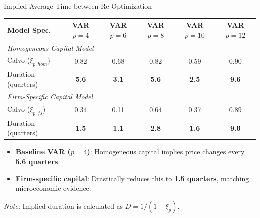 \begin{frame}{Implied Average Time between Re-Optimization}
    \centering
    \scriptsize

    \begin{table}[htpb]
        \centering
        \renewcommand{\arraystretch}{1.1}
        \begin{tabular}{lccccc}
            \toprule
            \textbf{Model Spec.} & \textbf{VAR $p=4$} & \textbf{VAR $p=6$} & \textbf{VAR $p=8$} & \textbf{VAR $p=10$} & \textbf{VAR $p=12$} \\
            \midrule

            \multicolumn{6}{l}{\textit{Homogeneous Capital Model}} \\
            Calvo ($\xi_{p, hom}$) & 0.82 & 0.68 & 0.82 & 0.59 & 0.90 \\
            Duration (quarters)     & \textbf{5.6} & \textbf{3.1} & \textbf{5.6} & \textbf{2.5} & \textbf{9.6} \\

            \midrule
            \multicolumn{6}{l}{\textit{Firm-Specific Capital Model}} \\
            Calvo ($\xi_{p, fs}$) & 0.34 & 0.11 & 0.64 & 0.37 & 0.89 \\
            Duration (quarters)    & \textbf{1.5} & \textbf{1.1} & \textbf{2.8} & \textbf{1.6} & \textbf{9.0} \\

            \bottomrule
        \end{tabular}
    \end{table}

    \vspace{0.2cm}
    \begin{itemize}
        \item \textbf{Baseline VAR ($p=4$)}: Homogeneous capital implies price changes every \textbf{5.6 quarters}.
        \item \textbf{Firm-specific capital}: Drastically reduces this to \textbf{1.5 quarters}, matching microeconomic evidence.
    \end{itemize}

    \vspace{0.2cm}
    \raggedright
    \tiny{\textit{Note:} Implied duration is calculated as $D = 1/(1 - \xi_p)$.}
\end{frame}
